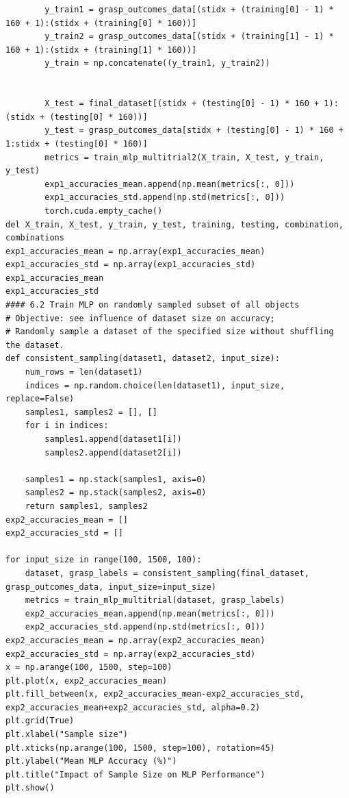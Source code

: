 \documentclass[11pt, a4paper]{report}
\begin{document}
\begin{lstlisting}
        y_train1 = grasp_outcomes_data[(stidx + (training[0] - 1) * 160 + 1):(stidx + (training[0] * 160))]
        y_train2 = grasp_outcomes_data[(stidx + (training[1] - 1) * 160 + 1):(stidx + (training[1] * 160))]
        y_train = np.concatenate((y_train1, y_train2))
        

        X_test = final_dataset[(stidx + (testing[0] - 1) * 160 + 1):(stidx + (testing[0] * 160))]
        y_test = grasp_outcomes_data[stidx + (testing[0] - 1) * 160 + 1:stidx + (testing[0] * 160)]
        metrics = train_mlp_multitrial2(X_train, X_test, y_train, y_test)
        exp1_accuracies_mean.append(np.mean(metrics[:, 0]))
        exp1_accuracies_std.append(np.std(metrics[:, 0]))
        torch.cuda.empty_cache()
del X_train, X_test, y_train, y_test, training, testing, combination, combinations
exp1_accuracies_mean = np.array(exp1_accuracies_mean)
exp1_accuracies_std = np.array(exp1_accuracies_std)
exp1_accuracies_mean
exp1_accuracies_std
#### 6.2 Train MLP on randomly sampled subset of all objects
# Objective: see influence of dataset size on accuracy;
# Randomly sample a dataset of the specified size without shuffling the dataset.
def consistent_sampling(dataset1, dataset2, input_size):
    num_rows = len(dataset1)
    indices = np.random.choice(len(dataset1), input_size, replace=False)
    samples1, samples2 = [], []
    for i in indices:
        samples1.append(dataset1[i])
        samples2.append(dataset2[i])
    
    samples1 = np.stack(samples1, axis=0)
    samples2 = np.stack(samples2, axis=0)
    return samples1, samples2
exp2_accuracies_mean = []
exp2_accuracies_std = []

for input_size in range(100, 1500, 100):
    dataset, grasp_labels = consistent_sampling(final_dataset, grasp_outcomes_data, input_size=input_size)
    metrics = train_mlp_multitrial(dataset, grasp_labels)
    exp2_accuracies_mean.append(np.mean(metrics[:, 0]))
    exp2_accuracies_std.append(np.std(metrics[:, 0]))
exp2_accuracies_mean = np.array(exp2_accuracies_mean)
exp2_accuracies_std = np.array(exp2_accuracies_std)
x = np.arange(100, 1500, step=100)
plt.plot(x, exp2_accuracies_mean)
plt.fill_between(x, exp2_accuracies_mean-exp2_accuracies_std, exp2_accuracies_mean+exp2_accuracies_std, alpha=0.2)
plt.grid(True)
plt.xlabel("Sample size")
plt.xticks(np.arange(100, 1500, step=100), rotation=45)
plt.ylabel("Mean MLP Accuracy (%)")
plt.title("Impact of Sample Size on MLP Performance")
plt.show()
\end{lstlisting}
\end{document}
